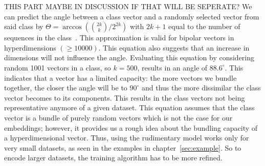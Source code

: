 THIS PART MAYBE IN DISCUSSION IF THAT WILL BE SEPERATE? We can predict the angle between a class vector and a randomly selected vector from said class by $\Theta = \arccos({2k \choose k}/2^{2k})$ with $2k+1$ equal to the number of sequences in the class~\cite{sathdv}. This approximation is valid for bipolar vectors in hyperdimensions $(\ge 10000)$. This equation also suggests that an increase in dimensions will not influence the angle. Evaluating this equation by considering random 1001 vectors in a class, so $k = 500$, results in an angle of $88.6^{\circ}$. This indicates that a vector has a limited capacity: the more vectors we bundle together, the closer the angle will be to $90^{\circ}$ and thus the more dissimilar the class vector becomes to its components. This results in the class vectors not being representative anymore of a given dataset. This equation assumes that the class vector is a bundle of purely random vectors which is not the case for our embeddings; however, it provides us a rough idea about the bundling capacity of a hyperdimensional vector. Thus, using the rudimentary model works only for very small datasets, as seen in the examples in chapter~\ref{sec:example}. So to encode larger datasets, the training algorithm has to be more refined.

\begin{table}[h]
    \caption{\label{tab:phalpclass}Results of type classifications using the principal classification technique of hyperdimensional computing,an XGBoost classifier and OnlineHD implementations with several kinds of embeddings}
\end{table}

